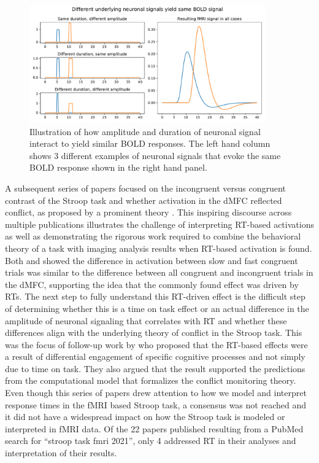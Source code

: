 \documentclass[titlepage,12pt] {article}
\begin{document}
 \begin{figure}[h!]
  \centering
   \includegraphics[width=4in]{Figures/neuron_same_bold.pdf}
   \caption{Illustration of how amplitude and duration of neuronal signal interact to yield similar BOLD responses.  The left hand column shows 3 different examples of neuronal signals that evoke the same BOLD response shown in the right hand panel.   }
  \label{fig:neuron_bold}
 \end{figure}

A subsequent series of papers focused on the incongruent versus congruent contrast of the Stroop task and whether activation in the dMFC reflected conflict, as proposed by a prominent theory \citep{botvinick2001}.  This inspiring discourse across multiple publications illustrates the challenge of interpreting RT-based activations as well as demonstrating the rigorous work required to combine the behavioral theory of a task with imaging analysis results when RT-based activation is found.  Both \citet{grinband_dorsal_2011} and \citet{carp_conditional_2010} showed the difference in activation between slow and fast congruent trials was similar to the difference between all congruent and incongruent trials in the dMFC, supporting the idea that the commonly found effect was driven by RTs.   The next step to fully understand this RT-driven effect is the difficult step of determining whether this is a time on task effect or an actual difference in the amplitude of neuronal signaling that correlates with RT and whether these differences align with the underlying theory of conflict in the Stroop task.  This was the focus of follow-up work by \citet{yeung_errors_2011} who proposed that the RT-based effects were a result of differential engagement of specific cognitive processes and not simply due to time on task. They also argued that the result supported the predictions from the computational model that formalizes the conflict monitoring theory.   Even though this series of papers drew attention to how we model and interpret response times in the fMRI based Stroop task, a consensus was not reached \citep{brown_medial_2011, grinbandConflictErrorLikelihood2011,nachevBlindExecutive2011} and it did not have a widespread impact on how the Stroop task is modeled or interpreted in fMRI data. Of the 22 papers published resulting from a PubMed search for ``stroop task fmri 2021'', only 4 addressed RT in their analyses and interpretation of their results.  
\end{document}
